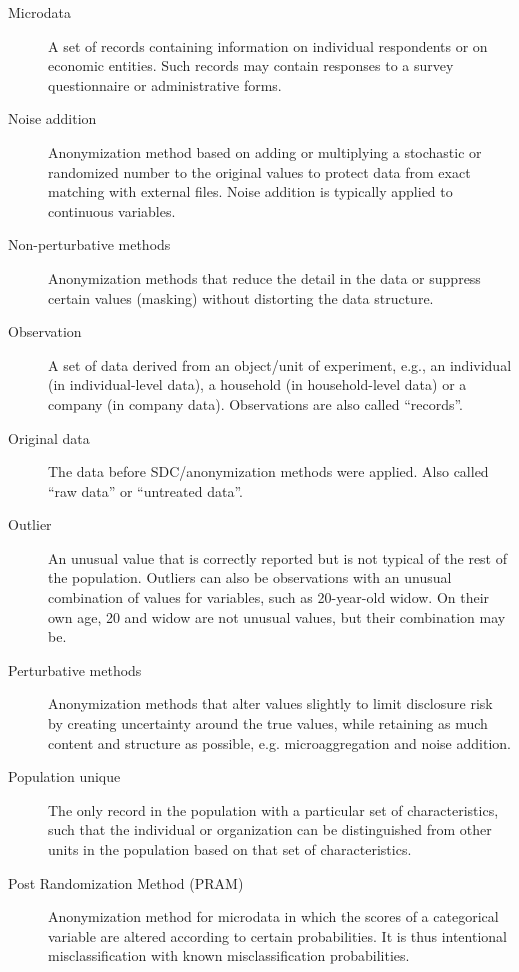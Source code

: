 \documentclass[letterpaper,10pt,english]{sphinxmanual}
\begin{document}
\begin{description}
\item[{Microdata}] \leavevmode
A set of records containing information on individual respondents or on  economic
entities. Such records   may contain responses to a survey questionnaire or
administrative   forms.

\item[{Noise addition}] \leavevmode
Anonymization method based on  adding or multiplying a   stochastic or randomized
number   to the original values to protect data from exact matching with
external files. Noise addition is typically applied to continuous   variables.

\item[{Non-perturbative methods}] \leavevmode
Anonymization methods that reduce the detail in the data or suppress certain
values (masking) without distorting the data structure.

\item[{Observation}] \leavevmode
A set of data derived from an  object/unit of experiment, e.g.,  an individual
(in  individual-level data), a household (in household-level  data) or a company
(in company data). Observations are also   called “records”.

\item[{Original data}] \leavevmode
The data before SDC/anonymization methods were applied. Also called “raw data”
or “untreated data”.

\item[{Outlier}] \leavevmode
An unusual value that is  correctly reported but is not  typical of the rest of the population.
Outliers can also be  observations with an unusual   combination of values for variables,
such as 20-year-old widow. On their own age, 20 and   widow are not unusual values, but their combination may  be. \sphinxfootnotemark[1]

\item[{Perturbative methods}] \leavevmode
Anonymization methods that alter  values slightly to limit  disclosure risk by creating uncertainty around the true values, while retaining as much   content and structure as  possible, e.g. microaggregation   and noise addition.

\item[{Population unique}] \leavevmode
The only record in the population with a particular set of  characteristics, such that the individual or organization can be distinguished from other units in the population based on that set  of characteristics.

\item[{Post Randomization Method (PRAM)}] \leavevmode
Anonymization method for  microdata in which the scores of  a categorical variable
are altered according to certain   probabilities. It is thus intentional misclassification
with known misclassification   probabilities. \sphinxfootnotemark[1]


\end{description}
\end{document}
